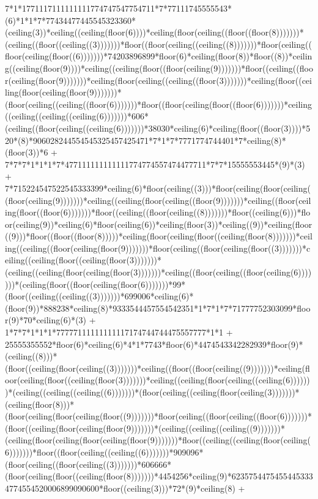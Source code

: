 7*1*1771117111111111774747547754711*7*77111745555543*(6)*1*1*7*77434477445545323360*(ceiling(3))*ceiling((ceiling(floor(6))))*ceiling(floor(ceiling((floor((floor(8)))))))*(ceiling((floor((ceiling((3)))))))*floor((floor(ceiling((ceiling((8)))))))*floor(ceiling((floor(ceiling(floor((6)))))))*74203896899*floor(6)*ceiling(floor(8))*floor((8))*ceiling((ceiling(floor(9))))*ceiling((ceiling(floor((floor(ceiling(9)))))))*floor((ceiling((floor(ceiling(floor(9)))))))*ceiling(floor(ceiling((ceiling((floor(3)))))))*ceiling(floor((ceiling(floor(ceiling(floor(9)))))))*(floor(ceiling((ceiling((floor(6)))))))*floor((floor(ceiling(floor((floor(6)))))))*ceiling((ceiling((ceiling((ceiling(6)))))))*606*(ceiling((floor(ceiling((ceiling(6)))))))*38030*ceiling(6)*ceiling(floor((floor(3))))*520*(8)*906028244554545325457425471*7*1*7*7771774744401*7*ceiling(8)*(floor(3))*6 + 7*7*7*1*1*1*7*477111111111111774774557474477711*7*7*15555553445*(9)*(3) + 7*715224547522545333399*ceiling(6)*floor(ceiling((3)))*floor(ceiling(floor(ceiling((floor(ceiling(9)))))))*ceiling((ceiling(floor(ceiling((floor(9)))))))*ceiling((floor(ceiling(floor((floor(6)))))))*floor((ceiling((floor(ceiling((8)))))))*floor((ceiling(6)))*floor(ceiling(9))*ceiling(6)*floor(ceiling(6))*ceiling(floor(3))*ceiling((9))*ceiling(floor((9)))*floor((floor((floor(8)))))*ceiling(floor(ceiling(floor((ceiling(floor(8)))))))*ceiling((ceiling((floor(ceiling(floor(9)))))))*floor(ceiling((floor(ceiling(floor((3)))))))*ceiling((ceiling(floor((ceiling(floor(3)))))))*(ceiling((ceiling(floor(ceiling(floor(3)))))))*ceiling((floor(ceiling((floor(ceiling(6)))))))*(ceiling(floor((floor(ceiling(floor(6)))))))*99*(floor((ceiling((ceiling((3)))))))*699006*ceiling(6)*(floor(9))*888238*ceiling(8)*9333544457554542351*1*7*1*7*71777752303099*floor(9)*70*ceiling(6)*(3) + 1*7*7*1*1*1*77777111111111117174744744475557777*1*1 + 25555355552*floor(6)*ceiling(6)*4*1*7743*floor(6)*4474543342282939*floor(9)*(ceiling((8)))*(floor((ceiling(floor(ceiling((3)))))))*ceiling((floor((floor(ceiling((9)))))))*ceiling(floor(ceiling(floor((ceiling(floor(3)))))))*ceiling((ceiling(floor(ceiling((ceiling(6)))))))*(ceiling((ceiling((ceiling((6)))))))*(floor(ceiling((ceiling(floor(ceiling(3)))))))*(ceiling(floor(8)))*(floor(ceiling(floor(ceiling(floor((9)))))))*floor(ceiling((floor(ceiling((floor(6)))))))*(floor((ceiling(floor(ceiling(floor(9)))))))*(ceiling((ceiling((ceiling((9)))))))*(ceiling(floor(ceiling(floor(ceiling(floor(9)))))))*floor((ceiling((ceiling(floor(ceiling(6)))))))*floor((floor(ceiling((ceiling((6)))))))*909096*(floor(ceiling((floor(ceiling((3)))))))*606666*(floor(ceiling(floor((ceiling(floor(8)))))))*4454256*ceiling(9)*62357544754554453334774554520006899090600*floor((ceiling(3)))*72*(9)*ceiling(8) + 